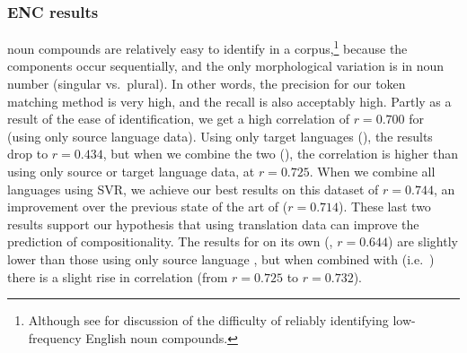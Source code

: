 \documentclass[output=paper,modfonts,nonflat]{langsci/langscibook}
\begin{document}
\subsubsection{ENC results}

 noun compounds are relatively easy to identify in a
corpus,\footnote{Although see \citet{Lapata:2003} for discussion of
  the difficulty of reliably identifying low-frequency English noun
  compounds.} because the components occur sequentially, and the only
morphological variation is in noun number (singular vs.\ plural). In
other words, the precision for our token matching method is very high,
and the recall is also acceptably high. Partly as a result of the ease
of identification, we get a high correlation of $r = 0.700$ for
\CSsource (using only source language data). Using only target
languages (\CStarg), the results drop to $r = 0.434$, but when we
combine the two (\CSsourcetarg), the correlation is higher than using
only source or target language data, at $r = 0.725$. When we combine
all languages using SVR, we achieve our best results on this dataset
of $r = 0.744$, an improvement over the previous state of the art of
\citet{reddy2011a} ($r = 0.714$). These last two results support our
hypothesis that using translation data can improve the prediction of
compositionality. The results for  on its own
(\CSstring, $r = 0.644$) are slightly lower than those using only
source language , but when combined with
\CSsourcetarg (i.e.\ \CSall) there is a slight rise in correlation
(from $r = 0.725$ to $r = 0.732$).



\end{document}
